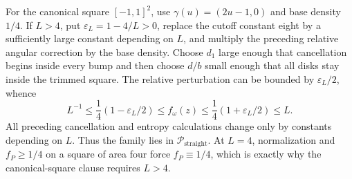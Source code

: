 For the canonical square \([-1,1]^2\), use \(\gamma(u)=(2u-1,0)\) and base density \(1/4\).  If \(L>4\), put \(\varepsilon_L=1-4/L>0\), replace the cutoff constant eight by a sufficiently large constant depending on \(L\), and multiply the preceding relative angular correction by the base density.  Choose \(d_1\) large enough that cancellation begins inside every bump and then choose \(d/b\) small enough that all disks stay inside the trimmed square.  The relative perturbation can be bounded by \(\varepsilon_L/2\), whence
\[
 L^{-1}\leq\frac14(1-\varepsilon_L/2)
 \leq f_\omega(z)
 \leq\frac14(1+\varepsilon_L/2)\leq L.
\]
All preceding cancellation and entropy calculations change only by constants depending on \(L\).  Thus the family lies in \(\mathcal P_{\mathrm{straight}}\).  At \(L=4\), normalization and \(f_P\geq1/4\) on a square of area four force \(f_P\equiv1/4\), which is exactly why the canonical-square clause requires \(L>4\).